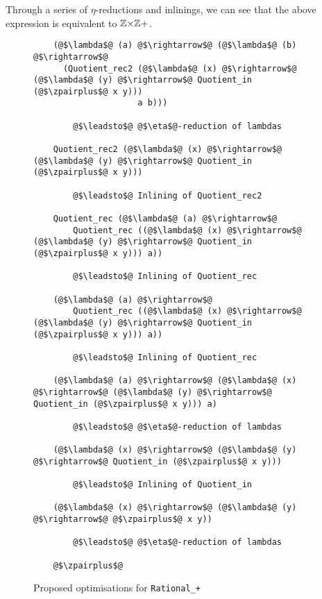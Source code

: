 \documentclass[12pt,twoside,maitrise]{dms}
\theoremstyle{definition}
\numberwithin{equation}{section}
\numberwithin{table}{chapter}
\numberwithin{figure}{chapter}
\newcommand\id[1] {\texttt{#1}}
\begin{document}
Through a series of $\eta$-reductions and inlinings, we can see that the above
expression is equivalent to $\mathbb{Z}{\times}\mathbb{Z}+$.

\begin{figure}
\begin{mdframed}
\begin{verbatim}
    (@$\lambda$@ (a) @$\rightarrow$@ (@$\lambda$@ (b) @$\rightarrow$@
      (Quotient_rec2 (@$\lambda$@ (x) @$\rightarrow$@ (@$\lambda$@ (y) @$\rightarrow$@ Quotient_in (@$\zpairplus$@ x y)))
                     a b)))

        @$\leadsto$@ @$\eta$@-reduction of lambdas

    Quotient_rec2 (@$\lambda$@ (x) @$\rightarrow$@ (@$\lambda$@ (y) @$\rightarrow$@ Quotient_in (@$\zpairplus$@ x y)))

        @$\leadsto$@ Inlining of Quotient_rec2

    Quotient_rec (@$\lambda$@ (a) @$\rightarrow$@
        Quotient_rec ((@$\lambda$@ (x) @$\rightarrow$@ (@$\lambda$@ (y) @$\rightarrow$@ Quotient_in (@$\zpairplus$@ x y))) a))

        @$\leadsto$@ Inlining of Quotient_rec

    (@$\lambda$@ (a) @$\rightarrow$@
        Quotient_rec ((@$\lambda$@ (x) @$\rightarrow$@ (@$\lambda$@ (y) @$\rightarrow$@ Quotient_in (@$\zpairplus$@ x y))) a))

        @$\leadsto$@ Inlining of Quotient_rec

    (@$\lambda$@ (a) @$\rightarrow$@ (@$\lambda$@ (x) @$\rightarrow$@ (@$\lambda$@ (y) @$\rightarrow$@ Quotient_in (@$\zpairplus$@ x y))) a)

        @$\leadsto$@ @$\eta$@-reduction of lambdas

    (@$\lambda$@ (x) @$\rightarrow$@ (@$\lambda$@ (y) @$\rightarrow$@ Quotient_in (@$\zpairplus$@ x y)))

        @$\leadsto$@ Inlining of Quotient_in

    (@$\lambda$@ (x) @$\rightarrow$@ (@$\lambda$@ (y) @$\rightarrow$@ @$\zpairplus$@ x y))

        @$\leadsto$@ @$\eta$@-reduction of lambdas

    @$\zpairplus$@
\end{verbatim}
\end{mdframed}
\caption{Proposed optimisations for \id{Rational\_+}}\label{fig:optim-rational-add}
\end{figure}
\end{document}
